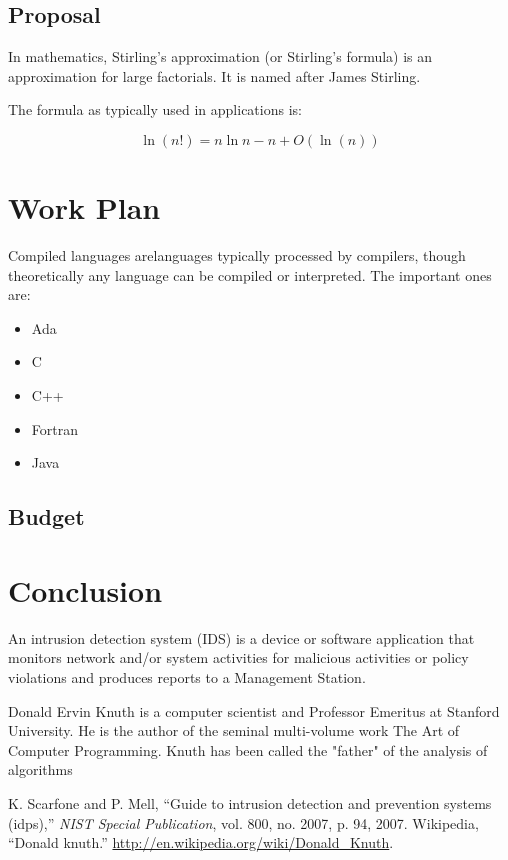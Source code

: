 \documentclass{fisatproject}
\begin{document}
\section{Proposal}
In mathematics, Stirling's approximation (or Stirling's formula) is an approximation for large factorials. It is named after James Stirling.

The formula as typically used in applications is:

$$
\ln (n!) = n \ln n - n  + O(\ln(n))
$$

\chapter{Work Plan}

Compiled languages arelanguages typically processed by compilers, though theoretically any language can be compiled or interpreted. The important ones are:
\begin{itemize}
\item Ada
\item C
\item C++
\item Fortran
\item Java
\end{itemize}

\section{Budget}


\chapter{Conclusion}

An intrusion detection system (IDS) \cite{nist} is a device or software application that monitors network and/or system activities for malicious activities or policy violations and produces reports to a Management Station.


Donald Ervin Knuth \cite{knuth} is a computer scientist and Professor Emeritus at Stanford University. He is the author of the seminal multi-volume work The Art of Computer Programming. Knuth has been called the "father" of the analysis of algorithms


\begin{thebibliography}{1}
 K. Scarfone and P. Mell, ``Guide to intrusion detection and prevention systems
(idps),'' \textit{NIST Special Publication}, vol. 800, no. 2007, p. 94, 2007.
 Wikipedia, ``Donald knuth.'' \url{http://en.wikipedia.org/wiki/Donald_Knuth}.
\end{thebibliography}
\end{document}
